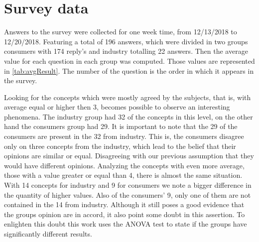 \section{Survey data}

Answers to the survey were collected for one week time, from 12/13/2018 to 12/20/2018. Featuring a total of 196 answers, which were divided in two groups consumers with 174 reply's and industry totalling 22 answers. Then the average value for each question in each group was computed. Those values are represented in \autoref{tab:avgResult}. The number of the question is the order in which it appears in the survey.



Looking for the concepts which were mostly agreed by the subjects, that is, with average equal or higher then 3, becomes possible to observe an interesting phenomena. The industry group had 32 of the concepts in this level, on the other hand the consumers group had 29. It is important to note that the 29 of the consumers are present in the 32 from industry. This is, the consumers disagree only on three concepts from the industry, which lead to the belief that their opinions are similar or equal. Disagreeing with our previous assumption that they would have different opinions. Analyzing the concepts with even more average, those with a value greater or equal than 4, there is almost the same situation. With 14 concepts for industry and 9 for consumers we note a bigger difference in the quantity of higher values. Also of the consumers' 9, only one of them are not contained in the 14 from industry. Although it still poses a good evidence that the groups opinion are in accord, it also point some doubt in this assertion. To enlighten this doubt this work uses the ANOVA test to state if the groups have significantly different results.

